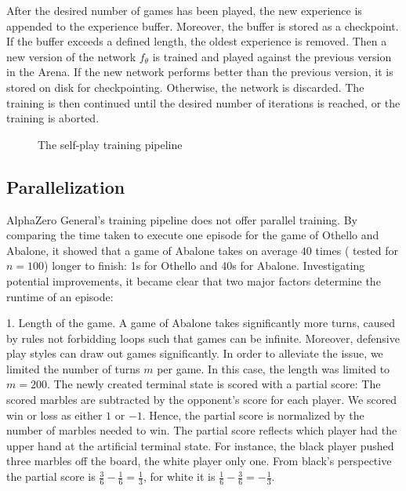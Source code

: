 After the desired number of games has been played, the new experience is appended to the experience buffer. Moreover, the buffer is stored as a checkpoint. If the buffer exceeds a defined length, the oldest experience is removed. Then a new version of the network $f_{\theta}$ is trained and played against the previous version in the Arena. If the new network performs better than the previous version, it is stored on disk for checkpointing. Otherwise, the network is discarded. The training is then continued until the desired number of iterations is reached, or the training is aborted.

\begin{figure}[H]
    \centering
    \caption{The self-play training pipeline}
    \label{training_algorithm}
\end{figure}

\subsection{Parallelization}
\label{parallelization}
AlphaZero General's training pipeline does not offer parallel training. By comparing the time taken to execute one episode for the game of Othello and Abalone, it showed that a game of Abalone takes on average $40$ times ( tested for $n=100$) longer to finish: 1s for Othello and 40s for Abalone. Investigating potential improvements, it became clear that two major factors determine the runtime of an episode:

1. Length of the game. A game of Abalone takes significantly more turns, caused by rules not forbidding loops such that games can be infinite. Moreover, defensive play styles can draw out games significantly. In order to alleviate the issue, we limited the number of turns $m$ per game. In this case, the length was limited to $m=200$. The newly created terminal state is scored with a partial score: The scored marbles are subtracted by the opponent's score for each player. We scored win or loss as either $1$ or $-1$. Hence, the partial score is normalized by the number of marbles needed to win. The partial score reflects which player had the upper hand at the artificial terminal state. For instance, the black player pushed three marbles off the board, the white player only one. From black's perspective the partial score is $\frac{3}{6} - \frac{1}{6} = \frac{1}{3}$, for white it is $\frac{1}{6} - \frac{3}{6} = -\frac{1}{3}$.

